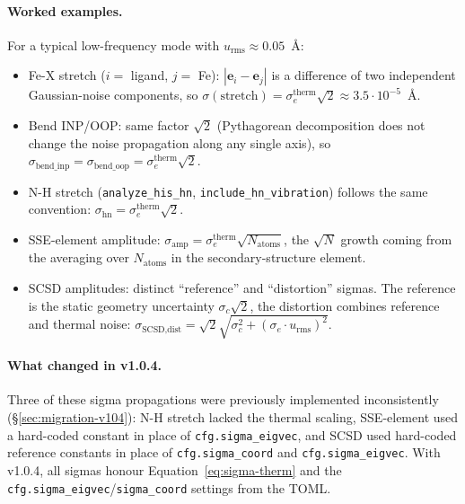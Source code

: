 \documentclass[11pt,a4paper,twoside]{article}
\newcommand{\evec}{\mathbf{e}}
\newcommand{\urms}{u_{\mathrm{rms}}}
\theoremstyle{remark}
\begin{document}
\paragraph{Worked examples.} For a typical low-frequency mode with
$\urms \approx 0.05$~\AA{}:
\begin{itemize}\setlength{\itemsep}{0pt}
  \item Fe-X stretch ($i = $ ligand, $j = $ Fe):
        $|\evec_i - \evec_j|$ is a difference of two independent
        Gaussian-noise components, so
        $\sigma(\text{stretch}) = \sigma_e^\text{therm}\sqrt{2}
        \approx 3.5\cdot 10^{-5}$~\AA.
  \item Bend INP/OOP: same factor $\sqrt{2}$ (Pythagorean
        decomposition does not change the noise propagation along
        any single axis), so $\sigma_\text{bend\_inp}
        = \sigma_\text{bend\_oop} = \sigma_e^\text{therm}\sqrt{2}$.
  \item N-H stretch (\texttt{analyze\_his\_hn}, \texttt{include\_hn\_vibration})
        follows the same convention:
        $\sigma_\text{hn} = \sigma_e^\text{therm}\sqrt{2}$.
  \item SSE-element amplitude:
        $\sigma_\text{amp} = \sigma_e^\text{therm}\sqrt{N_\text{atoms}}$,
        the $\sqrt{N}$ growth coming from the averaging over
        $N_\text{atoms}$ in the secondary-structure element.
  \item SCSD amplitudes: distinct ``reference'' and ``distortion''
        sigmas. The reference is the static geometry uncertainty
        $\sigma_c\sqrt{2}$, the distortion combines reference and
        thermal noise:
        $\sigma_\text{SCSD,dist}
         = \sqrt{2}\sqrt{\sigma_c^2 + (\sigma_e \cdot \urms)^2}$.
\end{itemize}

\paragraph{What changed in v1.0.4.} Three of these sigma
propagations were previously implemented inconsistently
(\S\ref{sec:migration-v104}): N-H stretch lacked the thermal
scaling, SSE-element used a hard-coded constant in place of
\texttt{cfg.sigma\_eigvec}, and SCSD used hard-coded reference
constants in place of \texttt{cfg.sigma\_coord} and
\texttt{cfg.sigma\_eigvec}. With v1.0.4, all sigmas honour
Equation~\ref{eq:sigma-therm} and the
\texttt{cfg.sigma\_eigvec}/\texttt{sigma\_coord} settings
from the TOML.

\end{document}
